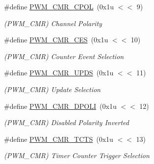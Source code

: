 \begin{DoxyCompactItemize}
\mbox{\label{group__SAME70__PWM_gaaf63b55ca5a5fca06ef63e14542b6d80}} 
\#define \mbox{\hyperlink{group__SAME70__PWM_gaaf63b55ca5a5fca06ef63e14542b6d80}{P\+W\+M\+\_\+\+C\+M\+R\+\_\+\+C\+P\+OL}}~(0x1u $<$$<$ 9)
\begin{DoxyCompactList}\small\item\em (P\+W\+M\+\_\+\+C\+MR) Channel Polarity \end{DoxyCompactList}\item 
\mbox{\label{group__SAME70__PWM_ga0bb07f5754d14efb326e0a4a6d0d275c}} 
\#define \mbox{\hyperlink{group__SAME70__PWM_ga0bb07f5754d14efb326e0a4a6d0d275c}{P\+W\+M\+\_\+\+C\+M\+R\+\_\+\+C\+ES}}~(0x1u $<$$<$ 10)
\begin{DoxyCompactList}\small\item\em (P\+W\+M\+\_\+\+C\+MR) Counter Event Selection \end{DoxyCompactList}\item 
\mbox{\label{group__SAME70__PWM_ga0286fa373fce5c6a2e8a5caa773fa792}} 
\#define \mbox{\hyperlink{group__SAME70__PWM_ga0286fa373fce5c6a2e8a5caa773fa792}{P\+W\+M\+\_\+\+C\+M\+R\+\_\+\+U\+P\+DS}}~(0x1u $<$$<$ 11)
\begin{DoxyCompactList}\small\item\em (P\+W\+M\+\_\+\+C\+MR) Update Selection \end{DoxyCompactList}\item 
\mbox{\label{group__SAME70__PWM_gad4e1477bf352624727ff3a58db213be8}} 
\#define \mbox{\hyperlink{group__SAME70__PWM_gad4e1477bf352624727ff3a58db213be8}{P\+W\+M\+\_\+\+C\+M\+R\+\_\+\+D\+P\+O\+LI}}~(0x1u $<$$<$ 12)
\begin{DoxyCompactList}\small\item\em (P\+W\+M\+\_\+\+C\+MR) Disabled Polarity Inverted \end{DoxyCompactList}\item 
\mbox{\label{group__SAME70__PWM_ga5b0bd8f4431c759ed715d81de18a8eac}} 
\#define \mbox{\hyperlink{group__SAME70__PWM_ga5b0bd8f4431c759ed715d81de18a8eac}{P\+W\+M\+\_\+\+C\+M\+R\+\_\+\+T\+C\+TS}}~(0x1u $<$$<$ 13)
\begin{DoxyCompactList}\small\item\em (P\+W\+M\+\_\+\+C\+MR) Timer Counter Trigger Selection \end{DoxyCompactList}\item 
$$
\end{DoxyCompactItemize}
